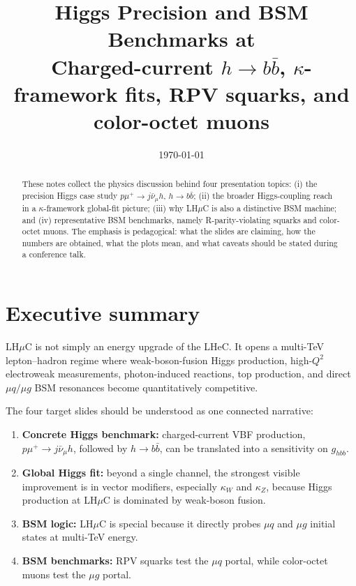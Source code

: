 \documentclass[11pt,a4paper]{article}
\title{\vspace{-1.0cm}
\textbf{Higgs Precision and BSM Benchmarks at \LHmuC}\\[1mm]
\large Charged-current \(h\to b\bar b\), \(\kappa\)-framework fits, RPV squarks, and color-octet muons}
\date{\today}
\newcommand{\LHmuC}{LH\ensuremath{\mu}C}
\newcommand{\ghbb}{\ensuremath{g_{hbb}}}
\newcommand{\kW}{\ensuremath{\kappa_W}}
\newcommand{\kZ}{\ensuremath{\kappa_Z}}
\newenvironment{keypoint}[1]{%
\par\medskip\noindent{\large\bfseries\color{aghgreen}#1}\par\noindent
\begin{minipage}{0.97\linewidth}\itshape
}{\end{minipage}\par\medskip}
\begin{document}
\maketitle

\begin{abstract}
These notes collect the physics discussion behind four presentation topics:
(i) the precision Higgs case study \(p\mu^+\to j\bar\nu_\mu h\), \(h\to b\bar b\);
(ii) the broader Higgs-coupling reach in a \(\kappa\)-framework global-fit picture;
(iii) why \LHmuC{} is also a distinctive BSM machine; and
(iv) representative BSM benchmarks, namely R-parity-violating squarks and color-octet muons.
The emphasis is pedagogical: what the slides are claiming, how the numbers are obtained,
what the plots mean, and what caveats should be stated during a conference talk.
\end{abstract}



\section{Executive summary}



\begin{keypoint}{The short physics story}
\vspace{0.25cm}
\LHmuC{} is not simply an energy upgrade of the LHeC.  It opens a multi-TeV
lepton--hadron regime where weak-boson-fusion Higgs production, high-\(Q^2\)
electroweak measurements, photon-induced reactions, top production, and direct
\(\mu q/\mu g\) BSM resonances become quantitatively competitive.
\end{keypoint}


The four target slides should be understood as one connected narrative:

\begin{enumerate}[leftmargin=*]
  \item \textbf{Concrete Higgs benchmark:} charged-current VBF production,
  \(p\mu^+\to j\bar\nu_\mu h\), followed by \(h\to b\bar b\), can be translated into
  a sensitivity on \(\ghbb\).
  \item \textbf{Global Higgs fit:} beyond a single channel, the strongest visible improvement
  is in vector modifiers, especially \(\kW\) and \(\kZ\), because Higgs production at
  \LHmuC{} is dominated by weak-boson fusion.
  \item \textbf{BSM logic:} \LHmuC{} is special because it directly probes \(\mu q\) and
  \(\mu g\) initial states at multi-TeV energy.
  \item \textbf{BSM benchmarks:} RPV squarks test the \(\mu q\) portal, while color-octet
  muons test the \(\mu g\) portal.
\end{enumerate}
\end{document}

